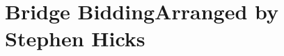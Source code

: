 \documentclass[oneside]{memoir}
\makeatletter
\def\nodepth#1{\setbox\z@\hbox{#1}\dp\z@=0\p@\box\z@}
\makeatother
\begin{document}
\def\row{\global\c@c\z@}
\def\spanrow#1#2{\multicolumn{#1}{l}{#2}\c@c\m@ne\global\advance\c@c#1}
\def\ob#1#2{\@@bid{#1}{lorange}{#2}}
\def\yb#1#2{\@@bid{#1}{lyellow}{#2}}
\def\gb#1#2{\@@bid{#1}{lgreen}{#2}}
\def\bb#1#2{\@@bid{#1}{lblue}{#2}}
\def\pb#1#2{\@@bid{#1}{lred}{#2}}
\def\vb#1#2{\@@bid{#1}{lpurple}{#2}}
\def\ab#1#2{\@@bid{#1}{laqua}{#2}}

\def\oc#1#2{\@@bid{#1}{lorange}{}}
\def\yc#1#2{\@@bid{#1}{lyellow}{}}
\def\gc#1#2{\@@bid{#1}{lgreen}{}}
\def\bc#1#2{\@@bid{#1}{lblue}{}}
\def\pc#1#2{\@@bid{#1}{lred}{}}
\def\vc#1#2{\@@bid{#1}{lpurple}{}}
\def\ac#1#2{\@@bid{#1}{laqua}{}}

\def\ic{\futurelet\@foo\@ic}
\def\@ic{\let\@next\g@ic\ifx\@foo\egroup\let\@next\relax\fi\@next}
\def\g@ic#1{\futurelet\@foo\@ic}

\def\ditto#1{\raise 0.18pc\hbox to #1{\leaders\hrule\hfill\lower 0.4pc\hbox{\kern1ex''\kern0.6ex}\leaders\hrule\hfill}}


\def\w#1{\def\@top{}\def\@bot{}\@w#1\@go}
\let\ww\w
\def\@w#1{\let\@next\@w\ifx#1\@go\relax\let\@next\@go\else
  \ifx#1o\relax\edef\@top{\@top o}\fi
  \ifx#1d\relax\edef\@top{\@top d}\fi
  \ifx#1a\relax\edef\@bot{\@bot a}\fi
  \ifx#1i\relax\edef\@bot{\@bot i}\fi
  \ifx#1s\relax\edef\@bot{\@bot s}\fi
  \ifx#1f\relax\edef\@bot{\@bot f}\fi
  \ifx#1g\relax\edef\@bot{\@bot g}\fi
\fi\@next}
\def\@go{ \nodepth{${}^{\mathrm{\tiny\@bot}}_{\mathrm{\tiny\@top}}$}}



\section*{Bridge Bidding\hfill Arranged by Stephen Hicks}


\end{document}
